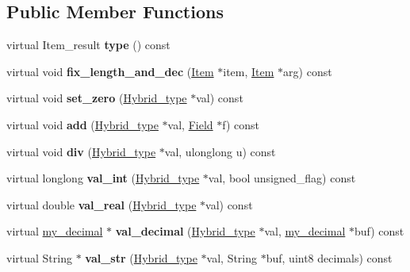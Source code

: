 \subsection*{Public Member Functions}
\begin{DoxyCompactItemize}
\item 
\mbox{\label{structHybrid__type__traits_a2ea36b5cb00ad0b4084bc5703a48eeb7}} 
virtual Item\+\_\+result {\bfseries type} () const
\item 
\mbox{\label{structHybrid__type__traits_a450307c5e4848355f15f2f9e280ee0c9}} 
virtual void {\bfseries fix\+\_\+length\+\_\+and\+\_\+dec} (\mbox{\hyperlink{classItem}{Item}} $\ast$item, \mbox{\hyperlink{classItem}{Item}} $\ast$arg) const
\item 
\mbox{\label{structHybrid__type__traits_a149db7a405c62dcf1c50d8c1027a80f2}} 
virtual void {\bfseries set\+\_\+zero} (\mbox{\hyperlink{structHybrid__type}{Hybrid\+\_\+type}} $\ast$val) const
\item 
\mbox{\label{structHybrid__type__traits_af1dd0a89a31064bfa8473de312fc5b74}} 
virtual void {\bfseries add} (\mbox{\hyperlink{structHybrid__type}{Hybrid\+\_\+type}} $\ast$val, \mbox{\hyperlink{classField}{Field}} $\ast$f) const
\item 
\mbox{\label{structHybrid__type__traits_a500cbd2e332b19527c738228f1e3af30}} 
virtual void {\bfseries div} (\mbox{\hyperlink{structHybrid__type}{Hybrid\+\_\+type}} $\ast$val, ulonglong u) const
\item 
\mbox{\label{structHybrid__type__traits_a2de29c8cbcbf01ee4404110b63e347a9}} 
virtual longlong {\bfseries val\+\_\+int} (\mbox{\hyperlink{structHybrid__type}{Hybrid\+\_\+type}} $\ast$val, bool unsigned\+\_\+flag) const
\item 
\mbox{\label{structHybrid__type__traits_af97c119e8673db6d3178671b2594d223}} 
virtual double {\bfseries val\+\_\+real} (\mbox{\hyperlink{structHybrid__type}{Hybrid\+\_\+type}} $\ast$val) const
\item 
\mbox{\label{structHybrid__type__traits_af17a4fd7b9a116bc326949ae08c3a43b}} 
virtual \mbox{\hyperlink{classmy__decimal}{my\+\_\+decimal}} $\ast$ {\bfseries val\+\_\+decimal} (\mbox{\hyperlink{structHybrid__type}{Hybrid\+\_\+type}} $\ast$val, \mbox{\hyperlink{classmy__decimal}{my\+\_\+decimal}} $\ast$buf) const
\item 
\mbox{\label{structHybrid__type__traits_a10fb5a4261f960588df46b8f41f4b92a}} 
virtual String $\ast$ {\bfseries val\+\_\+str} (\mbox{\hyperlink{structHybrid__type}{Hybrid\+\_\+type}} $\ast$val, String $\ast$buf, uint8 decimals) const
\end{DoxyCompactItemize}
